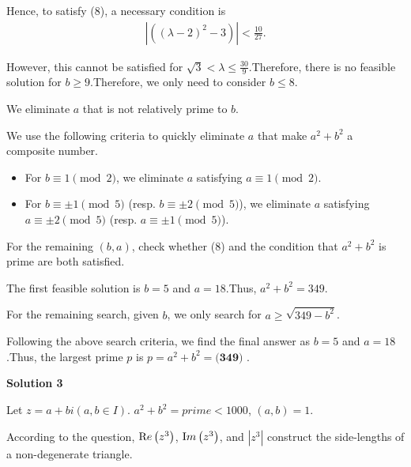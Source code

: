 \begin{enumerate}
{{ Hence, to satisfy (8), a necessary condition is
 \begin{align*} \left| \left( \left( \lambda - 2 \right)^2 - 3 \right)  \right| < \frac{10}{27} . \end{align*}


 However, this cannot be satisfied for $\sqrt{3} < \lambda \leq \frac{30}{9}$.Therefore, there is no feasible solution for $b \geq 9$.Therefore, we only need to consider $b \leq 8$.

 We eliminate $a$ that is not relatively prime to $b$.

 We use the following criteria to quickly eliminate $a$ that make $a^2 + b^2$ a composite number.

 
            \begin{itemize}
        \item For $b \equiv 1 \pmod{2}$, we eliminate $a$ satisfying $a \equiv 1 \pmod{2}$.
            \end{itemize}
            
            \begin{itemize}
        \item For $b \equiv \pm 1 \pmod{5}$ (resp. $b \equiv \pm 2 \pmod{5}$), we eliminate $a$ satisfying $a \equiv \pm 2 \pmod{5}$ (resp. $a \equiv \pm 1 \pmod{5}$).
            \end{itemize}
            
\item For the remaining $\left( b, a \right)$, check whether (8) and the condition that $a^2 + b^2$ is prime are both satisfied.

 The first feasible solution is $b = 5$ and $a = 18$.Thus, $a^2 + b^2 = 349$.

 \item For the remaining search, given $b$, we only search for $a \geq \sqrt{349 - b^2}$.

 Following the above search criteria, we find the final answer as $b = 5$ and $a = 18$.Thus, the largest prime $p$ is $p = a^2 + b^2 = \boxed{\textbf{(349) }}$.

 



\textbf{Solution 3}

Let $z = a + b i (a,b\in I)$. $a^2 + b^2 = prime < 1000$, $(a,b) = 1$.

 According to the question, ${\textrm Re} \left( z^3 \right)$, ${\textrm Im} \left( z^3 \right)$, and $|z^3|$ construct the side-lengths of a non-degenerate triangle.

}}
\end{enumerate}
